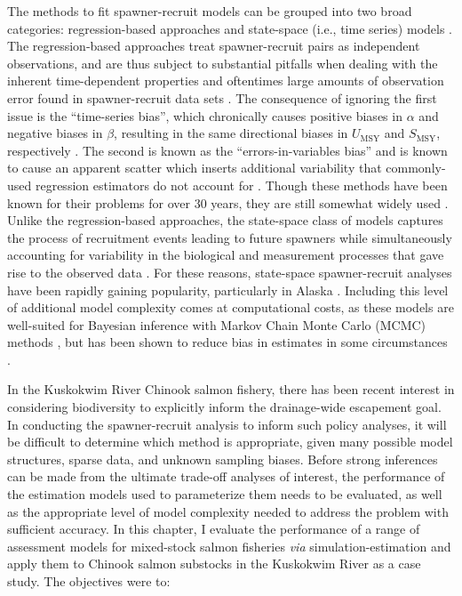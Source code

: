 \documentclass[12pt,]{book}
\theoremstyle{definition}
\theoremstyle{definition}
\theoremstyle{definition}
\theoremstyle{remark}
\begin{document}
The methods to fit spawner-recruit models can be grouped into two broad
categories: regression-based approaches \citep[e.g.,][]{clark-etal-2009}
and state-space (i.e., time series) models
\citep[e.g.,][]{su-peterman-2012, fleischman-etal-2013}. The
regression-based approaches treat spawner-recruit pairs as independent
observations, and are thus subject to substantial pitfalls when dealing
with the inherent time-dependent properties and oftentimes large amounts
of observation error found in spawner-recruit data sets \citep[Ch.
7]{walters-martell-2004}. The consequence of ignoring the first issue is
the ``time-series bias'', which chronically causes positive biases in
\(\alpha\) and negative biases in \(\beta\), resulting in the same
directional biases in \(U_{\text{MSY}}\) and \(S_{\text{MSY}}\),
respectively \citep[i.e., spuriously providing too aggressive harvest
policy recommendations;][]{walters-1985}. The second is known as the
``errors-in-variables bias'' and is known to cause an apparent scatter
which inserts additional variability that commonly-used regression
estimators do not account for \citep{ludwig-walters-1981}. Though these
methods have been known for their problems for over 30 years, they are
still somewhat widely used \citep[e.g.,][]{korman-english-2013}. Unlike
the regression-based approaches, the state-space class of models
captures the process of recruitment events leading to future spawners
while simultaneously accounting for variability in the biological and
measurement processes that gave rise to the observed data
\citep{devalpine-hastings-2002, fleischman-etal-2013}. For these
reasons, state-space spawner-recruit analyses have been rapidly gaining
popularity, particularly in Alaska
\citep{su-peterman-2012, fleischman-etal-2013, staton-etal-2017-intseq}.
Including this level of additional model complexity comes at
computational costs, as these models are well-suited for Bayesian
inference with Markov Chain Monte Carlo (MCMC) methods \citep[Ch.
4]{newman-etal-2014}, but has been shown to reduce bias in estimates in
some circumstances \citep{su-peterman-2012, walters-martell-2004}.

In the Kuskokwim River Chinook salmon fishery, there has been recent
interest in considering biodiversity to explicitly inform the
drainage-wide escapement goal. In conducting the spawner-recruit
analysis to inform such policy analyses, it will be difficult to
determine which method is appropriate, given many possible model
structures, sparse data, and unknown sampling biases. Before strong
inferences can be made from the ultimate trade-off analyses of interest,
the performance of the estimation models used to parameterize them needs
to be evaluated, as well as the appropriate level of model complexity
needed to address the problem with sufficient accuracy. In this chapter,
I evaluate the performance of a range of assessment models for
mixed-stock salmon fisheries \emph{via} simulation-estimation and apply
them to Chinook salmon substocks in the Kuskokwim River as a case study.
The objectives were to:
\end{document}
